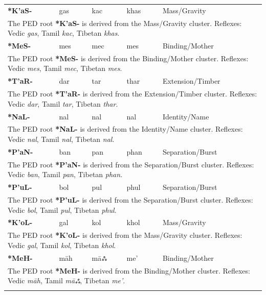 \begin{longtable}{p{} p{} p{} p{} p{}}
\textbf{*K'aS-} & gas & kac & khas & Mass/Gravity \\ 
\multicolumn{5}{p{\textwidth}}{\small The PED root \textbf{*K'aS-} is derived from the Mass/Gravity cluster. Reflexes: Vedic \textit{gas}, Tamil \textit{kac}, Tibetan \textit{khas}. } \\ \addlinespace 
\textbf{*MeS-} & mes & mec & mes & Binding/Mother \\ 
\multicolumn{5}{p{\textwidth}}{\small The PED root \textbf{*MeS-} is derived from the Binding/Mother cluster. Reflexes: Vedic \textit{mes}, Tamil \textit{mec}, Tibetan \textit{mes}. } \\ \addlinespace 
\textbf{*T'aR-} & dar & tar & thar & Extension/Timber \\ 
\multicolumn{5}{p{\textwidth}}{\small The PED root \textbf{*T'aR-} is derived from the Extension/Timber cluster. Reflexes: Vedic \textit{dar}, Tamil \textit{tar}, Tibetan \textit{thar}. } \\ \addlinespace 
\textbf{*NaL-} & nal & nal & nal & Identity/Name \\ 
\multicolumn{5}{p{\textwidth}}{\small The PED root \textbf{*NaL-} is derived from the Identity/Name cluster. Reflexes: Vedic \textit{nal}, Tamil \textit{nal}, Tibetan \textit{nal}. } \\ \addlinespace 
\textbf{*P'aN-} & ban & pan & phan & Separation/Burst \\ 
\multicolumn{5}{p{\textwidth}}{\small The PED root \textbf{*P'aN-} is derived from the Separation/Burst cluster. Reflexes: Vedic \textit{ban}, Tamil \textit{pan}, Tibetan \textit{phan}. } \\ \addlinespace 
\textbf{*P'uL-} & bol & pul & phul & Separation/Burst \\ 
\multicolumn{5}{p{\textwidth}}{\small The PED root \textbf{*P'uL-} is derived from the Separation/Burst cluster. Reflexes: Vedic \textit{bol}, Tamil \textit{pul}, Tibetan \textit{phul}. } \\ \addlinespace 
\textbf{*K'oL-} & gal & kol & khol & Mass/Gravity \\ 
\multicolumn{5}{p{\textwidth}}{\small The PED root \textbf{*K'oL-} is derived from the Mass/Gravity cluster. Reflexes: Vedic \textit{gal}, Tamil \textit{kol}, Tibetan \textit{khol}. } \\ \addlinespace 
\textbf{*MeH-} & māh & māஃ & me' & Binding/Mother \\ 
\multicolumn{5}{p{\textwidth}}{\small The PED root \textbf{*MeH-} is derived from the Binding/Mother cluster. Reflexes: Vedic \textit{māh}, Tamil \textit{māஃ}, Tibetan \textit{me'}. } \\ \addlinespace 

\end{longtable}
